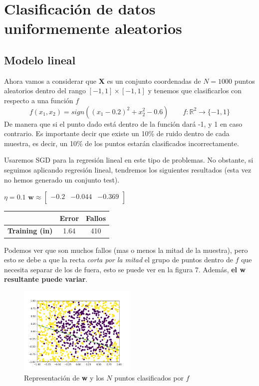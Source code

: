 \documentclass{article}
\begin{document}
    
    \pagebreak
    \section{Clasificación de datos uniformemente aleatorios}
    \subsection{Modelo lineal}
    Ahora vamos a considerar que \textbf{X} es un conjunto coordenadas de $N = 1000$ puntos
    aleatorios dentro del rango $[-1,1] \times [-1,1]$ y tenemos que clasificarlos con respecto a una
    función $f$
    \begin{equation*}
        f(x_1,x_2) = sign((x_1 - 0.2)^2 + x_2^2 - 0.6) \qquad f:\mathbb{R}^2 \to \{-1,1\}
    \end{equation*}
    De manera que si el punto dado está dentro de la función dará -1, y 1 en caso contrario.
    Es importante decir que existe un 10\% de ruido dentro de cada muestra, es decir, un 10\%
    de los puntos estarán clasificados incorrectamente.
    
    Usaremos SGD para la regresión lineal en este tipo de problemas.
    No obstante, si seguimos aplicando regresión lineal, tendremos los siguientes resultados
    (esta vez no hemos generado un conjunto test).
    \begin{center}
        $\eta = 0.1$
        \qquad
        $\textbf{w} \approx \begin{bmatrix}
            -0.2 & -0.044 & -0.369 \\
        \end{bmatrix}$
        \qquad
        \begin{tabular}{ |c|c|c| }
            \hline
            & \textbf{Error} & \textbf{Fallos} \\
            \hline
            \textbf{Training (in)} & 1.64 & 410 \\
            \hline
        \end{tabular}
    \end{center}
    Podemos ver que son muchos fallos (mas o menos la mitad de la muestra), pero esto se debe
    a que la recta \emph{corta por la mitad} el grupo de puntos dentro de $f$ que necesita separar
    de los de fuera, esto se puede ver en la figura 7. Además, \textbf{el w resultante puede variar}.
    \begin{figure}[h]
        \caption{Representación de \textbf{w} y los $N$ puntos clasificados por $f$}
        \centering
        \includegraphics[width=0.5\textwidth]{Figure_6.png}
    \end{figure}
\end{document}
